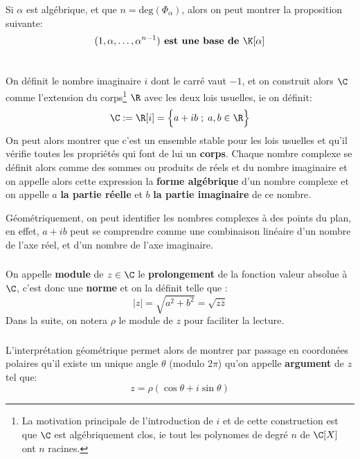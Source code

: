 \subsection*{}
Si \( \alpha \) est algébrique, et que \( n = \text{deg}(\Phi_\alpha) \), alors on peut montrer la proposition suivante:
\[ 
   (1, \alpha, \ldots, \alpha^{n-1}) \textbf{ est une base de } \K[\alpha] 
\]

\chapter*{} %

On définit le nombre imaginaire \(i\) dont le carré vaut \(-1\), et on construit alors \(\C\) comme l'extension du corps\footnote[1]{La motivation principale de l'introduction de \(i\) et de cette construction est que \(\C\) est algébriquement clos, ie tout les polynomes de degré \(n\) de \(\C[X]\) ont \(n\) racines.} \(\R\) avec les deux lois usuelles, ie on définit:
\[
   \C := \R[i] = \Bigl\{a + ib \; ; \; a, b \in \R \Bigl\}
\]
On peut alors montrer que c'est un ensemble stable pour les lois usuelles et qu'il vérifie toutes les propriétés qui font de lui un \textbf{corps}.\+
Chaque nombre complexe se définit alors comme des sommes ou produits de réels et du nombre imaginaire et on appelle alors cette expression la \textbf{forme algébrique} d'un nombre complexe et on appelle \(a\) \textbf{la partie réelle} et \(b\) \textbf{la partie imaginaire} de ce nombre. \<

Géométriquement, on peut identifier les nombres complexes à des points du plan, en effet, \(a + ib\) peut se comprendre comme une combinaison linéaire d'un nombre de l'axe réel, et d'un nombre de l'axe imaginaire.

\subsection*{}
On appelle \textbf{module} de \(z \in \C\) le \textbf{prolongement} de la fonction valeur absolue à \(\C\), c'est donc une \textbf{norme} et on la définit telle que {:}
\[
   |z| = \sqrt{a^2 + b^2} = \sqrt{z\overline{z}} 
\]
Dans la suite, on notera \(\rho\) le module de \(z\) pour faciliter la lecture.

\subsection*{}
L'interprétation géométrique permet alors de montrer par passage en coordonées polaires qu'il existe un unique angle \(\theta\) (modulo \(2\pi\)) qu'on appelle \textbf{argument} de \(z\) tel que:
\[
    z = \rho(\cos\theta+i\sin\theta)   
\]

